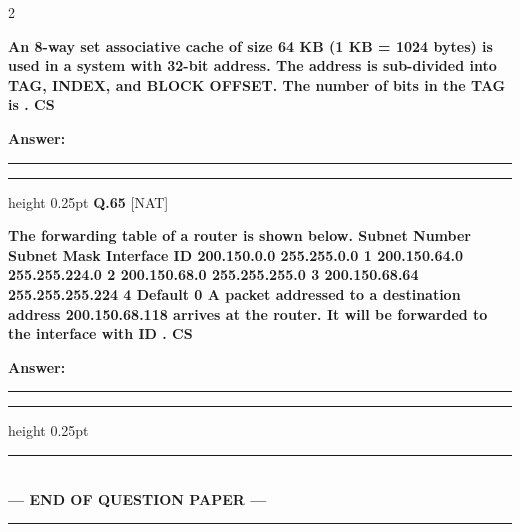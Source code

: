 \documentclass[a4paper,10pt,twoside]{article}
\begin{document}
\begin{multicols}{2}
$$\par\vspace{2pt}
{\bfseries An 8-way set associative cache of size 64 KB (1 KB = 1024 bytes) is used in a
system with 32-bit address. The address is sub-divided into TAG, INDEX, and
BLOCK OFFSET.
The number of bits in the TAG is
.
CS \par}
\par\vspace{3pt}\noindent\textbf{Answer:} \rule{3.2cm}{0.4pt}
\par\vspace{6pt}\hrule height 0.25pt\vspace{6pt}
\noindent\textbf{Q.65} \hfill {\footnotesize\textsf{[NAT]}}
\par\vspace{2pt}
{\bfseries The forwarding table of a router is shown below.
Subnet Number
Subnet Mask
Interface ID
200.150.0.0
255.255.0.0
1
200.150.64.0
255.255.224.0
2
200.150.68.0
255.255.255.0
3
200.150.68.64
255.255.255.224
4
Default
0
A packet addressed to a destination address 200.150.68.118 arrives at the router.
It will be forwarded to the interface with ID
.
CS \par}
\par\vspace{3pt}\noindent\textbf{Answer:} \rule{3.2cm}{0.4pt}
\par\vspace{6pt}\hrule height 0.25pt\vspace{6pt}
\end{multicols}
\vspace{8pt}
\begin{center}
\rule{0.35\linewidth}{0.5pt}\\[2pt]
\textbf{\small --- END OF QUESTION PAPER ---}\\[-8pt]
\rule{0.35\linewidth}{0.5pt}
\end{center}
\vspace{10pt}
\end{document}
